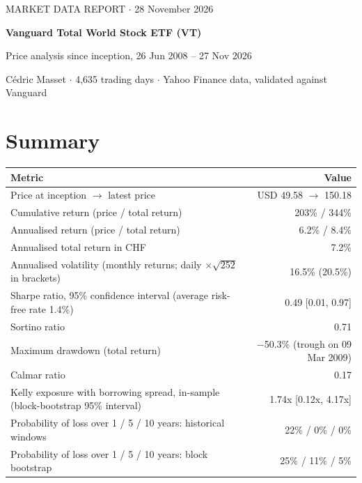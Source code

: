 \documentclass[11pt,a4paper]{article}
\begin{document}
\thispagestyle{fancy}
{%
{\footnotesize\color{muted}\MakeUppercase{Market data report} $\cdot$ 28 November 2026}\par\vspace{0.6em}
{\fontsize{22}{26}\selectfont\bfseries\color{ink} Vanguard Total World Stock ETF (VT)\par}\vspace{0.3em}
{\large\color{muted} Price analysis since inception, 26 Jun 2008 -- 27 Nov 2026\par}\vspace{0.2em}
{\small\color{muted} Cédric Masset $\cdot$ 4,635 trading days $\cdot$ Yahoo Finance data, validated against Vanguard\par}
}
\vspace{0.4em}

\section*{Summary}

\begin{table}[H]
\footnotesize
\begin{tabularx}{\linewidth}{L r}
\toprule
\textbf{Metric} & \textbf{Value} \\
\midrule
Price at inception $\rightarrow$ latest price & USD 49.58 $\rightarrow$ 150.18 \\
Cumulative return (price / total return) & 203\% / 344\% \\
Annualised return (price / total return) & 6.2\% / 8.4\% \\
Annualised total return in CHF & 7.2\% \\
Annualised volatility (monthly returns; daily $\times\sqrt{252}$ in brackets) & 16.5\% (20.5\%) \\
Sharpe ratio, 95\% confidence interval (average risk-free rate 1.4\%) & 0.49 [0.01, 0.97] \\
Sortino ratio & 0.71 \\
Maximum drawdown (total return) & $-$50.3\% (trough on 09 Mar 2009) \\
Calmar ratio & 0.17 \\
Kelly exposure with borrowing spread, in-sample (block-bootstrap 95\% interval) & 1.74x [0.12x, 4.17x] \\
Probability of loss over 1 / 5 / 10 years: historical windows & 22\% / 0\% / 0\% \\
Probability of loss over 1 / 5 / 10 years: block bootstrap & 25\% / 11\% / 5\% \\
\bottomrule
\end{tabularx}
\end{table}
\end{document}
